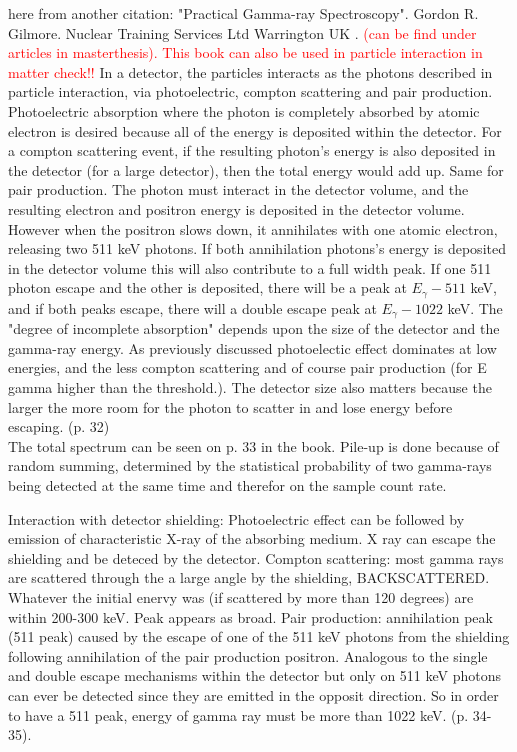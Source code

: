 \noindent 
here from another citation: "Practical Gamma-ray Spectroscopy". Gordon R. Gilmore. Nuclear Training Services Ltd Warrington UK \cite{Gilmore2008} . \textcolor{red}{(can be find under articles in masterthesis). This book can also be used in particle interaction in matter check!!}
In a detector, the particles interacts as the photons described in particle interaction, via photoelectric, compton scattering and pair production. Photoelectric absorption where the photon is completely absorbed by atomic electron is desired because all of the energy is deposited within the detector. For a compton scattering event, if the resulting photon's energy is also deposited in the detector (for a large detector), then the total energy would add up. Same for pair production. The photon must interact in the detector volume, and the resulting electron and positron energy is deposited in the detector volume. However when the positron slows down, it annihilates with one atomic electron, releasing two 511 keV photons. If both annihilation photons's energy is deposited in the detector volume this will also contribute to a full width peak. If one 511 photon escape and the other is deposited, there will be a peak at $E_\gamma-511$ keV, and if both peaks escape, there will a double escape peak at $E_\gamma-1022$ keV. The "degree of incomplete absorption" depends upon the size of the detector and the gamma-ray energy. As previously discussed photoelectic effect dominates at low energies, and the less compton scattering and of course pair production (for E gamma higher than the threshold.). The detector size also matters because the larger the more room for the photon to scatter in and lose energy before escaping. (p. 32) \\

The total spectrum can be seen on p. 33 in the book. Pile-up is done because of random summing, determined by the statistical probability of two gamma-rays being detected at the same time and therefor on the sample count rate. 

Interaction with detector shielding: Photoelectric effect can be followed by emission of characteristic X-ray of the absorbing medium. X ray can escape the shielding and be deteced by the detector. Compton scattering: most gamma rays are scattered through the a large angle by the shielding, BACKSCATTERED. Whatever the initial enervy  was (if scattered by more than 120 degrees) are within 200-300 keV. Peak appears as broad. Pair production: annihilation peak (511 peak) caused by the escape of one of the 511 keV photons from the shielding following annihilation of the pair production positron. Analogous to the single and double escape mechanisms within the detector but only on 511 keV photons can ever be detected since they are emitted in the opposit direction. So in order to have a 511 peak, energy of gamma ray must be more than 1022 keV. (p. 34-35).

